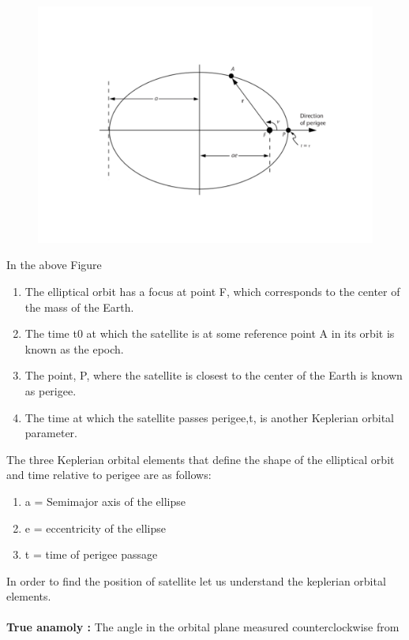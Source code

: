 \documentclass[journal,15pt,onecolumn]{IEEEtran}
\begin{document}
\begin{figure}
\includegraphics[scale=0.4]{./figs/1.pdf}
\end{figure}
\vspace{30cm}
In the above Figure 
\begin{enumerate}
\item The elliptical orbit has a focus at point
F, which corresponds to the center of the mass of the Earth.
\item The time t0 at which the satellite is at some
reference point A in its orbit is known as the epoch.
\item The point, P, where the satellite is closest to the center of the Earth
is known as perigee.
\item The time at which the satellite passes perigee,t, is another
Keplerian orbital parameter.
\end{enumerate}
\vspace{5mm}
The three Keplerian orbital elements
that define the shape of the elliptical orbit and time relative to perigee are as
follows: \\
\begin{enumerate}
  \item a = Semimajor axis of the ellipse
  \item e = eccentricity of the ellipse
  \item t = time of perigee passage
\end{enumerate}
In order to find the position of satellite let us understand the keplerian orbital elements.\\
\\
\textbf{True anamoly :} The angle in the orbital plane measured counterclockwise from
\end{document}
